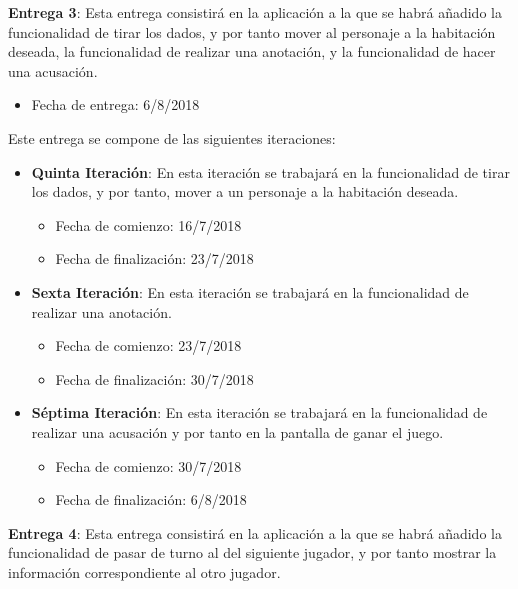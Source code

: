 \hfill

\textbf{Entrega 3}: Esta entrega consistirá en la aplicación a la que se habrá añadido la funcionalidad de tirar los dados, y por tanto mover al personaje a la habitación deseada, la funcionalidad de realizar una anotación, y la funcionalidad de hacer una acusación.

\begin{itemize}
  \item Fecha de entrega: 6/8/2018
\end{itemize}

\hfill

Este entrega se compone de las siguientes iteraciones:

\begin{itemize}
  \item \textbf{Quinta Iteración}: En esta iteración se trabajará en la funcionalidad de tirar los dados, y por tanto, mover a un personaje a la habitación deseada.

  \begin{itemize}
    \item Fecha de comienzo: 16/7/2018
    \item Fecha de finalización: 23/7/2018
  \end{itemize}

  \item \textbf{Sexta Iteración}: En esta iteración se trabajará en la funcionalidad de realizar una anotación.

  \begin{itemize}
    \item Fecha de comienzo: 23/7/2018
    \item Fecha de finalización: 30/7/2018
  \end{itemize}

  \item \textbf{Séptima Iteración}: En esta iteración se trabajará en la funcionalidad de realizar una acusación y por tanto en la pantalla de ganar el juego.

  \begin{itemize}
    \item Fecha de comienzo: 30/7/2018
    \item Fecha de finalización: 6/8/2018
  \end{itemize}
\end{itemize}

\hfill

\textbf{Entrega 4}: Esta entrega consistirá en la aplicación a la que se habrá añadido la funcionalidad de pasar de turno al del siguiente jugador, y por tanto mostrar la información correspondiente al otro jugador.

